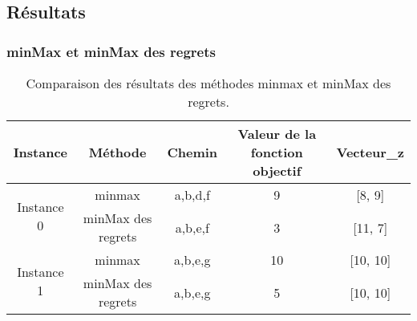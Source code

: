 \documentclass[10pt,a4paper]{report}
\begin{document}
\subsection*{Résultats}
\subsubsection{minMax et minMax des regrets}
\begin{table}[h!]
\centering
\renewcommand{\arraystretch}{1.5} %
\begin{tabular}{|c|c|c|c|c|}
\hline
\textbf{Instance} & \textbf{Méthode}        & \textbf{Chemin}  & \textbf{Valeur de la fonction objectif} & \textbf{Vecteur\_z} \\ \hline
\multirow{2}{*}{Instance 0} 
                  & minmax                  & a,b,d,f          & 9             & [8, 9]              \\ \cline{2-5}
                  & minMax des regrets      & a,b,e,f          & 3             & [11, 7]             \\ \hline
\multirow{2}{*}{Instance 1} 
                  & minmax                  & a,b,e,g          & 10            & [10, 10]            \\ \cline{2-5}
                  & minMax des regrets      & a,b,e,g          & 5             & [10, 10]            \\ \hline
\end{tabular}
\caption{Comparaison des résultats des méthodes minmax et minMax des regrets.}
\label{tab:resultats}
\end{table}
\end{document}
